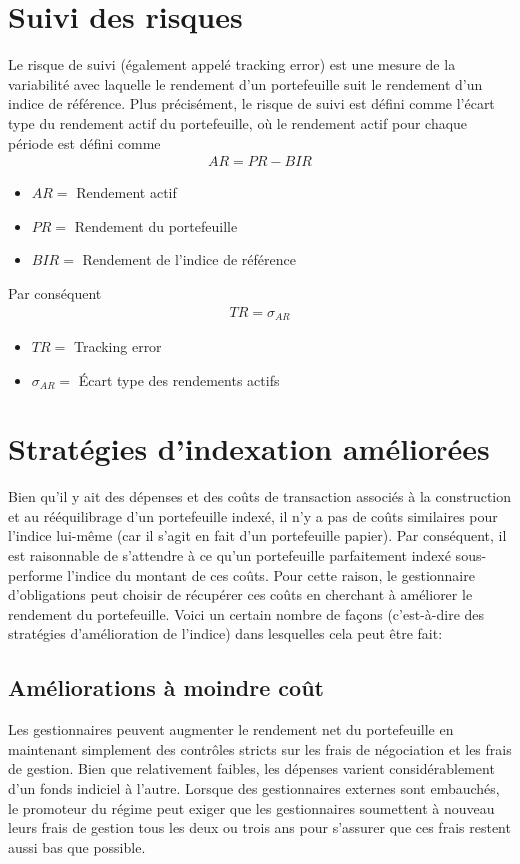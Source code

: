 \documentclass[12pt]{article}
\begin{document}
\section{Suivi des risques}
Le risque de suivi (également appelé tracking error) est une mesure de la variabilité avec laquelle le rendement d'un portefeuille suit le rendement d'un indice de référence. Plus précisément, le risque de suivi est défini comme l'écart type du rendement actif du portefeuille, où le rendement actif pour chaque période est défini comme
\begin{align*}
AR = PR-BIR
\end{align*}
\begin{itemize}
\item $AR=$ Rendement actif 
\item $PR=$ Rendement du portefeuille 
\item $BIR=$ Rendement de l'indice de référence
\end{itemize}
Par conséquent
\begin{align*}
TR=\sigma_{AR}
\end{align*}
\begin{itemize}
\item $TR=$ Tracking error
\item $\sigma_{AR}=$ Écart type des rendements actifs
\end{itemize}
\section{Stratégies d'indexation améliorées}
Bien qu'il y ait des dépenses et des coûts de transaction associés à la construction et au rééquilibrage d'un portefeuille indexé, il n'y a pas de coûts similaires pour l'indice lui-même (car il s'agit en fait d'un portefeuille papier). Par conséquent, il est raisonnable de s'attendre à ce qu'un portefeuille parfaitement indexé sous-performe l'indice du montant de ces coûts. Pour cette raison, le gestionnaire d’obligations peut choisir de récupérer ces coûts en cherchant à améliorer le rendement du portefeuille.  Voici un certain nombre de façons (c'est-à-dire des stratégies d'amélioration de l'indice) dans lesquelles cela peut être fait: 
\subsection{Améliorations à moindre coût}
Les gestionnaires peuvent augmenter le rendement net du portefeuille en maintenant simplement des contrôles stricts sur les frais de négociation et les frais de gestion. Bien que relativement faibles, les dépenses varient considérablement d'un fonds indiciel à l'autre. Lorsque des gestionnaires externes sont embauchés, le promoteur du régime peut exiger que les gestionnaires soumettent à nouveau leurs frais de gestion tous les deux ou trois ans pour s'assurer que ces frais restent aussi bas que possible.
\end{document}
